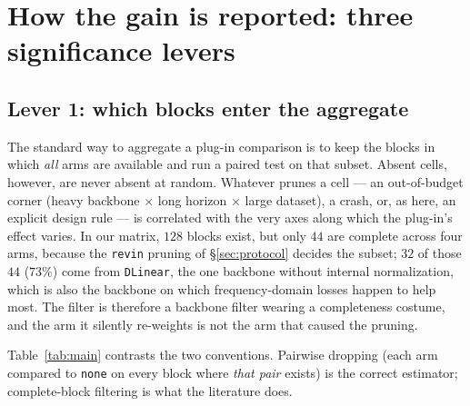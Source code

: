 \documentclass[a4paper,fleqn]{cas-sc}
\newcommand{\arm}[1]{\texttt{#1}}
\begin{document}
\section{How the gain is reported: three significance levers}
\label{sec:main}

\subsection{Lever 1: which blocks enter the aggregate}

The standard way to aggregate a plug-in comparison is to keep the blocks in
which \emph{all} arms are available and run a paired test on that subset.
Absent cells, however, are never absent at random. Whatever prunes a cell ---
an out-of-budget corner (heavy backbone $\times$ long horizon $\times$ large
dataset), a crash, or, as here, an explicit design rule --- is correlated with
the very axes along which the plug-in's effect varies. In our matrix, $128$
blocks exist, but only $44$ are complete across four arms, because the
\arm{revin} pruning of \S\ref{sec:protocol} decides the subset; $32$ of those
$44$ ($73\%$) come from \arm{DLinear}, the one backbone without internal
normalization, which is also the backbone on which frequency-domain losses
happen to help most. The filter is therefore a backbone filter wearing a
completeness costume, and the arm it silently re-weights is not the arm that
caused the pruning.

Table~\ref{tab:main} contrasts the two conventions. Pairwise dropping (each
arm compared to \arm{none} on every block where \emph{that pair} exists) is the
correct estimator; complete-block filtering is what the literature does.
\end{document}
